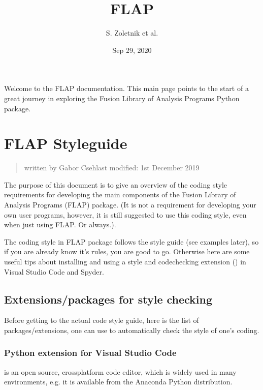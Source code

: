 \documentclass[letterpaper,10pt,english]{sphinxmanual}
\title{FLAP}
\date{Sep 29, 2020}
\author{S.\@{} Zoletnik et al.\@{}}
\begin{document}
\pagestyle{empty}
\sphinxmaketitle
\pagestyle{plain}
\sphinxtableofcontents
\pagestyle{normal}
\label{\detokenize{index::doc}}


Welcome to the FLAP documentation. This main page points to the start
of a great journey in exploring the Fusion Library of Analysis Programs
Python package.


\chapter{FLAP Styleguide}
\label{\detokenize{styleguide:flap-styleguide}}\label{\detokenize{styleguide::doc}}\begin{quote}

written by Gabor Csehlast modified: 1st December 2019
\end{quote}

The purpose of this document is to give an overview of the coding style requirements for developing the main components of the Fusion Library of Analysis Programs (FLAP) package. (It is not a requirement for developing your own user programs, however, it is still suggested to use this coding style, even when just using FLAP. Or always.).

The coding style in FLAP package follows the  style guide (see examples later), so if you are already know it’s rules, you are good to go. Otherwise here are some useful tips about installing and using a style\sphinxhyphen{} and code\sphinxhyphen{}checking extension () in Visual Studio Code and Spyder.


\section{Extensions/packages for style checking}
\label{\detokenize{styleguide:extensions-packages-for-style-checking}}
Before getting to the actual code style guide, here is the list of packages/extensions, one can use to automatically check the style of one’s coding.


\subsection{Python extension for Visual Studio Code}
\label{\detokenize{styleguide:python-extension-for-visual-studio-code}}
 is an open source, cross\sphinxhyphen{}platform code editor, which is widely used in many environments, e.g. it is available from the Anaconda Python distribution.
\end{document}
